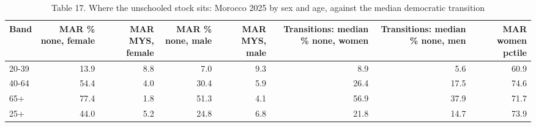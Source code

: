 \begin{table}
\caption{Table 17. Where the unschooled stock sits: Morocco 2025 by sex and age, against the median democratic transition}
\label{tab:T17_gender_cohort}
\begin{tabular}{lrrrrrrr}
\toprule
Band & MAR \% none, female & MAR MYS, female & MAR \% none, male & MAR MYS, male & Transitions: median \% none, women & Transitions: median \% none, men & MAR women pctile \\
\midrule
20-39 & 13.9 & 8.8 & 7.0 & 9.3 & 8.9 & 5.6 & 60.9 \\
40-64 & 54.4 & 4.0 & 30.4 & 5.9 & 26.4 & 17.5 & 74.6 \\
65+ & 77.4 & 1.8 & 51.3 & 4.1 & 56.9 & 37.9 & 71.7 \\
25+ & 44.0 & 5.2 & 24.8 & 6.8 & 21.8 & 14.7 & 73.9 \\
\bottomrule
\end{tabular}
\end{table}
